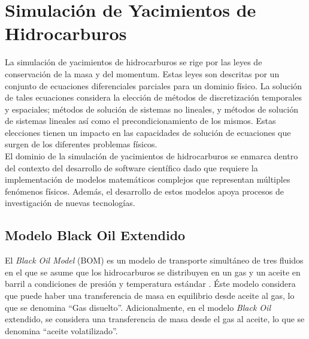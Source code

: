 \section{Simulación de Yacimientos de Hidrocarburos}
La simulación de yacimientos de hidrocarburos se rige por las leyes de conservación de la masa y del momentum. Estas leyes son descritas por un conjunto de ecuaciones diferenciales parciales para un dominio físico. La solución de tales ecuaciones considera la elección de métodos de discretización temporales y espaciales; métodos de solución de sistemas no lineales, y métodos de solución de sistemas lineales así como el precondicionamiento de los mismos. Estas elecciones tienen un impacto en las capacidades de solución de ecuaciones que surgen de los diferentes problemas físicos.\\

El dominio de la simulación de yacimientos de hidrocarburos se enmarca dentro del contexto del desarrollo de software científico dado que requiere la implementación de modelos matemáticos complejos que representan múltiples fenómenos físicos. Además, el desarrollo de estos modelos apoya procesos de investigación de nuevas tecnologías. \\%

\subsection{Modelo Black Oil Extendido}

El \textit{Black Oil Model} (BOM) es un modelo de transporte simultáneo de tres fluidos en el que se asume que los hidrocarburos se distribuyen en un gas y un aceite en barril a condiciones de presión y temperatura estándar \citep{jamal2006petroleum, chen2007reservoir, ertekin2001basic}. Éste modelo considera que puede haber una transferencia de masa en equilibrio desde aceite al gas, lo que se denomina ``Gas disuelto''. Adicionalmente, en el modelo \textit{Black Oil} extendido, se considera una transferencia de masa desde el gas al aceite, lo que se denomina ``aceite volatilizado''.

